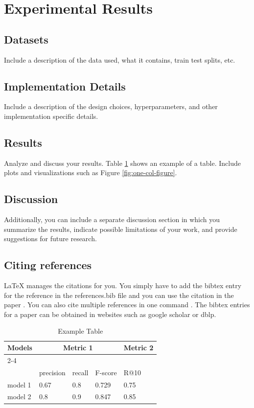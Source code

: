 \section{Experimental Results}
\subsection{Datasets}
Include a description of the data used, what it contains, train test splits, etc.
\subsection{Implementation Details}
Include a description of the design choices, hyperparameters, and other implementation specific details.

\subsection{Results}
Analyze and discuss your results. Table \ref{tab:example-table} shows an example of a table.
Include plots and visualizations such as Figure \ref{fig:one-col-figure}.

\subsection{Discussion}
Additionally, you can include a separate discussion section in which you summarize the results, indicate possible limitations of your work, and provide suggestions for future research.

\subsection{Citing references}
LaTeX manages the citations for you. You simply have to add the bibtex entry for the reference in the references.bib file and you can use the citation in the paper \cite{langley00}. You can also cite multiple references in one command \cite{DudaHart2nd,Newell81,kearns89}. The bibtex entries for a paper can be obtained in websites such as google scholar or dblp.

\begin{table}[ht]
    \centering
    \label{tab:example-table}
    \caption{Example Table}
    \begin{tabular}{lllll}
        \toprule
        \multirow{2}{*}{Models} & \multicolumn{3}{c}{Metric 1} & Metric 2\\
        \cmidrule{2-4} \cmidrule{5-5} \\
        {} & precision & recall & F-score  & R@10 \\
        \midrule
        model 1 & 0.67  & 0.8 & 0.729  & 0.75 \\
        model 2 & 0.8 & 0.9 & 0.847 & 0.85 \\
        \bottomrule
    \end{tabular}
\end{table}